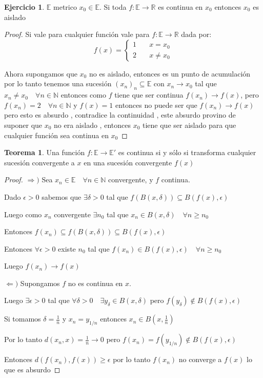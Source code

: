 \documentclass[12pt]{article}
\newcommand{\R}{\mathbb{R}}
\newcommand{\E}{\mathbb{E}}
\newcommand{\N}{\mathbb{N}}
\newcommand{\Ra}{\Rightarrow}
\newcommand{\ra}{\rightarrow}
\theoremstyle{definition}
\newtheorem{theorem}{Teorema}
\newtheorem{ej}{Ejercicio}
\begin{document}
\begin{ej}
  $\E$ metrico $x_0 \in \E$. Si toda $f: \E \ra \R$ es continua en $x_0$ entonces $x_0$ es aislado
  \begin{proof} Si vale para cualquier función vale para $f: \E \ra \R$ dada por:
    $$
f(x) = \left\{
        \begin{array}{ll}
            1 & \quad x = x_0 \\
            2 & \quad x \neq x_0
        \end{array}
    \right.
$$

Ahora supongamos que $x_0$ no es aislado, entonces es un punto de acumulación por lo tanto tenemos una sucesión $(x_n)_n \subseteq \E$ con $x_n \ra x_0$ tal que $x_n \neq x_0 \quad \forall n \in \N$ entonces como $f$ tiene que ser continua $f(x_n) \ra f(x)$, pero $f(x_n) = 2 \quad \forall n \in \N$ y $f(x) = 1$ entonces no puede ser que $f(x_n) \ra f(x)$ pero esto es absurdo , contradice la continuidad , este absurdo provino de suponer que $x_0$ no era aislado , entonces $x_0$ tiene que ser aislado para que cualquier función sea continua en $x_0$
  \end{proof}
\end{ej}
\begin{theorem}
  Una función $f:\E \ra \E '$ es continua si y sólo si transforma cualquier sucesión convergente a $x$ en una sucesión convergente $f(x)$
  \begin{proof}
    $\Ra )$ Sea $x_n \in \E \quad \forall n \in \N$ convergente, y $f$ continua. 

    Dado $\epsilon >0$ sabemos que $\exists \delta >0$ tal que $f(B(x,\delta))\subseteq B(f(x),\epsilon)$

    Luego como $x_n$ convergente $\exists n_0$ tal que $x_n \in B(x,\delta) \quad \forall n \geq n_0$

    Entonces $f(x_n) \subseteq f(B(x,\delta)) \subseteq B(f(x),\epsilon)$ 

    Entonces $\forall \epsilon >0 $ existe $n_0$ tal que $f(x_n) \in B(f(x), \epsilon) \quad \forall n \geq n_0$

    Luego $f(x_n) \ra f(x)$

  $\Leftarrow )$ Supongamos $f $ no es continua en $x$. 

Luego $\exists \epsilon >0$ tal que $\forall \delta >0 \quad \exists y_{\delta} \in B(x,\delta)$ pero $f(y_{\delta}) \notin B(f(x),\epsilon)$

Si tomamos $\delta = \frac{1}{n}$ y $x_n = y_{1/n}$ entonces $x_n \in B(x,\frac{1}{n})$

Por lo tanto $d(x_n,x) = \frac{1}{n} \ra 0$ pero $f(x_n) = f(y_{1/n}) \notin B(f(x),\epsilon)$

Entonces $d(f(x_n), f(x)) \geq \epsilon$ por lo tanto $f(x_n) $ no converge a $f(x)$ lo que es absurdo
  \end{proof}
\end{theorem}
\end{document}
